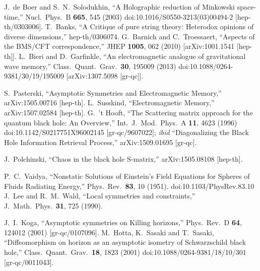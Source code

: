 \documentclass[12pt]{article}
\numberwithin{equation}{section}
\begin{document}
\begin{thebibliography}{99}
  J.~de Boer and S.~N.~Solodukhin,
  ``A Holographic reduction of Minkowski space-time,''
  Nucl.\ Phys.\ B {\bf 665}, 545 (2003)
  doi:10.1016/S0550-3213(03)00494-2
  [hep-th/0303006].
  T.~Banks,
  ``A Critique of pure string theory: Heterodox opinions of diverse dimensions,''
  hep-th/0306074.
  G.~Barnich and C.~Troessaert,
  ``Aspects of the BMS/CFT correspondence,''
  JHEP {\bf 1005}, 062 (2010)
  [arXiv:1001.1541 [hep-th]].
  L.~Bieri and D.~Garfinkle,
  ``An electromagnetic analogue of gravitational wave memory,''
  Class.\ Quant.\ Grav.\  {\bf 30}, 195009 (2013)
  doi:10.1088/0264-9381/30/19/195009
  [arXiv:1307.5098 [gr-qc]].

  S.~Pasterski,
  ``Asymptotic Symmetries and Electromagnetic Memory,''
  arXiv:1505.00716 [hep-th].
  L.~Susskind,
  ``Electromagnetic Memory,''
  arXiv:1507.02584 [hep-th].
  G.~'t Hooft,
  ``The Scattering matrix approach for the quantum black hole: An Overview,''
  Int.\ J.\ Mod.\ Phys.\ A {\bf 11}, 4623 (1996)
  doi:10.1142/S0217751X96002145
  [gr-qc/9607022];  {\it ibid} ``Diagonalizing the Black Hole Information Retrieval Process,''
  arXiv:1509.01695 [gr-qc].

  J.~Polchinski,
  ``Chaos in the black hole S-matrix,''
  arXiv:1505.08108 [hep-th].


 P.~C.~Vaidya,
 ``Nonstatic Solutions of Einstein's Field Equations for Spheres of Fluids Radiating Energy,''
 Phys.\ Rev.\  {\bf 83}, 10 (1951).
 doi:10.1103/PhysRev.83.10
  J.~Lee and R.~M.~Wald,
  ``Local symmetries and constraints,''
  J.\ Math.\ Phys.\  {\bf 31}, 725 (1990).


  J.~I.~Koga,
  ``Asymptotic symmetries on Killing horizons,''
  Phys.\ Rev.\ D {\bf 64}, 124012 (2001)
  [gr-qc/0107096].
  M.~Hotta, K.~Sasaki and T.~Sasaki,
  ``Diffeomorphism on horizon as an asymptotic isometry of Schwarzschild black hole,''
  Class.\ Quant.\ Grav.\  {\bf 18}, 1823 (2001)
  doi:10.1088/0264-9381/18/10/301
  [gr-qc/0011043].


\end{thebibliography}
\end{document}
